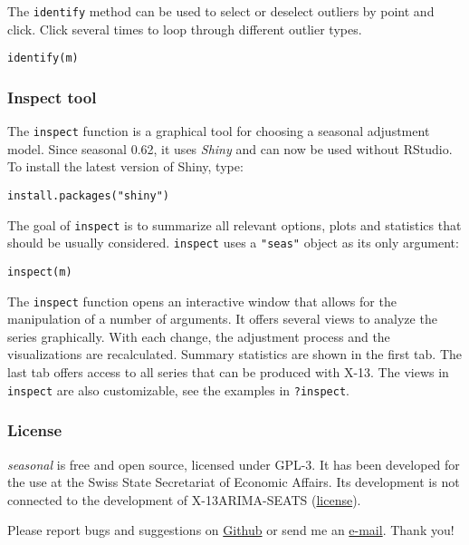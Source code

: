 The \texttt{identify} method can be used to select or deselect outliers
by point and click. Click several times to loop through different
outlier types.

\begin{verbatim}
identify(m)
\end{verbatim}

\subsubsection{Inspect tool}\label{inspect-tool}

The \texttt{inspect} function is a graphical tool for choosing a
seasonal adjustment model. Since seasonal 0.62, it uses \emph{Shiny} and
can now be used without RStudio. To install the latest version of Shiny,
type:

\begin{verbatim}
install.packages("shiny")
\end{verbatim}

The goal of \texttt{inspect} is to summarize all relevant options, plots
and statistics that should be usually considered. \texttt{inspect} uses
a \texttt{"seas"} object as its only argument:

\begin{verbatim}
inspect(m)
\end{verbatim}

The \texttt{inspect} function opens an interactive window that allows
for the manipulation of a number of arguments. It offers several views
to analyze the series graphically. With each change, the adjustment
process and the visualizations are recalculated. Summary statistics are
shown in the first tab. The last tab offers access to all series that
can be produced with X-13. The views in \texttt{inspect} are also
customizable, see the examples in \texttt{?inspect}.

\subsubsection{License}\label{license}

\emph{seasonal} is free and open source, licensed under GPL-3. It has
been developed for the use at the Swiss State Secretariat of Economic
Affairs. Its development is not connected to the development of
X-13ARIMA-SEATS
(\href{https://www.census.gov/srd/www/disclaimer.html}{license}).

Please report bugs and suggestions on
\href{https://github.com/christophsax/seasonal}{Github} or send me an
\href{mailto:christoph.sax@gmail.com}{e-mail}. Thank you!
